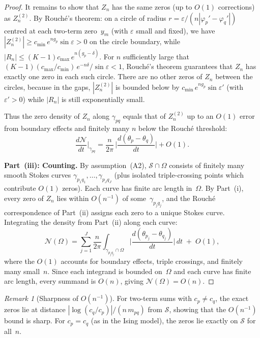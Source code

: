 \documentclass[12pt]{article}
\theoremstyle{definition}
\theoremstyle{remark}
\newtheorem{remark}[theorem]{Remark}
\begin{document}
\begin{proof}
It remains to show that $Z_n$ has the same zeros (up to $O(1)$
corrections) as $Z_n^{(2)}$.  By Rouch\'e's theorem: on a circle of
radius $r = \varepsilon/(n|\varphi_p' - \varphi_q'|)$ centred at each
two-term zero~$y_m$ (with $\varepsilon$ small and fixed), we have
$|Z_n^{(2)}| \geq c_{\min}\,e^{ng_p}\sin\varepsilon > 0$ on the
circle boundary, while $|R_n| \leq (K{-}1)c_{\max}\,e^{n(g_p-\delta)}$.
For $n$ sufficiently large that
$(K{-}1)(c_{\max}/c_{\min})\,e^{-n\delta}/\sin\varepsilon < 1$,
Rouch\'e's theorem guarantees that $Z_n$ has exactly one zero in each
such circle.  There are no other zeros of $Z_n$ between the circles,
because in the gaps, $|Z_n^{(2)}|$ is bounded below by
$c_{\min}\,e^{ng_p}\sin\varepsilon'$ (with $\varepsilon' > 0$) while
$|R_n|$ is still exponentially small.

Thus the zero density of $Z_n$ along $\gamma_{pq}$ equals that of
$Z_n^{(2)}$ up to an $O(1)$ error from boundary effects and
finitely many $n$ below the Rouch\'e threshold:
\[
\frac{d\mathcal{N}}{dt}\bigg|_{\gamma_{pq}} =
\frac{n}{2\pi}\,\bigg|\frac{d(\theta_p - \theta_q)}{dt}\bigg| + O(1).
\]

\medskip
\textbf{Part~(iii): Counting.}
By assumption~(A2), $\mathcal{S} \cap \Omega$ consists of finitely
many smooth Stokes curves $\gamma_{p_1 q_1}, \ldots, \gamma_{p_J q_J}$
(plus isolated triple-crossing points which contribute $O(1)$ zeros).
Each curve has finite arc length in~$\Omega$.  By Part~(i),
every zero of $Z_n$ lies within $O(n^{-1})$ of some~$\gamma_{p_j q_j}$,
and the Rouch\'e correspondence of Part~(ii) assigns each zero
to a unique Stokes curve.  Integrating the density from Part~(ii)
along each curve:
\[
\mathcal{N}(\Omega) = \sum_{j=1}^J
\frac{n}{2\pi}\int_{\gamma_{p_j q_j} \cap \Omega}
\bigg|\frac{d(\theta_{p_j} - \theta_{q_j})}{dt}\bigg|\,dt
\;+\; O(1),
\]
where the $O(1)$ accounts for boundary effects, triple crossings,
and finitely many small~$n$.
Since each integrand is bounded on~$\Omega$ and each curve has finite
arc length, every summand is $O(n)$, giving
$\mathcal{N}(\Omega) = O(n)$.
\qedhere
\end{proof}

\begin{remark}[Sharpness of $O(n^{-1})$]\label{rem:sharpness}
For two-term sums with $c_p \neq c_q$, the exact zeros lie at distance
$|\log(c_q/c_p)|/(n\,m_{pq})$ from $\mathcal{S}$, showing that the
$O(n^{-1})$ bound is sharp.  For $c_p = c_q$ (as in the Ising model),
the zeros lie exactly on $\mathcal{S}$ for all~$n$.
\end{remark}
\end{document}

